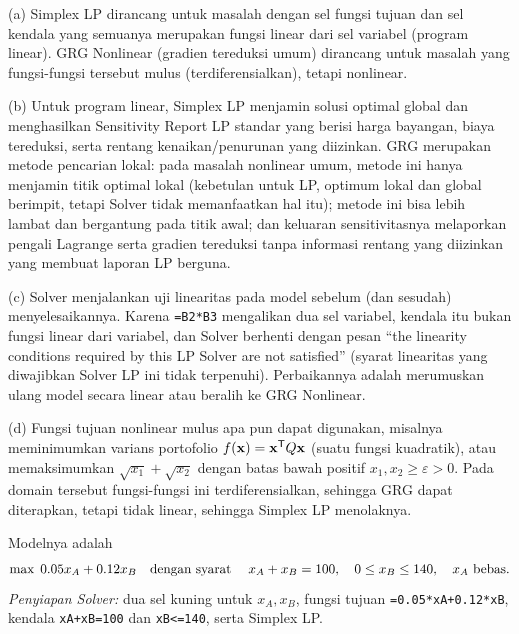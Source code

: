 
(a) Simplex LP dirancang untuk masalah dengan sel fungsi tujuan dan sel kendala yang semuanya merupakan fungsi linear dari sel variabel (program linear). GRG Nonlinear (gradien tereduksi umum) dirancang untuk masalah yang fungsi-fungsi tersebut mulus (terdiferensialkan), tetapi nonlinear.

(b) Untuk program linear, Simplex LP menjamin solusi optimal global dan menghasilkan Sensitivity Report LP standar yang berisi harga bayangan, biaya tereduksi, serta rentang kenaikan/penurunan yang diizinkan. GRG merupakan metode pencarian lokal: pada masalah nonlinear umum, metode ini hanya menjamin titik optimal lokal (kebetulan untuk LP, optimum lokal dan global berimpit, tetapi Solver tidak memanfaatkan hal itu); metode ini bisa lebih lambat dan bergantung pada titik awal; dan keluaran sensitivitasnya melaporkan pengali Lagrange serta gradien tereduksi tanpa informasi rentang yang diizinkan yang membuat laporan LP berguna.

(c) Solver menjalankan uji linearitas pada model sebelum (dan sesudah) menyelesaikannya. Karena \texttt{=B2*B3} mengalikan dua sel variabel, kendala itu bukan fungsi linear dari variabel, dan Solver berhenti dengan pesan ``the linearity conditions required by this LP Solver are not satisfied'' (syarat linearitas yang diwajibkan Solver LP ini tidak terpenuhi). Perbaikannya adalah merumuskan ulang model secara linear atau beralih ke GRG Nonlinear.

(d) Fungsi tujuan nonlinear mulus apa pun dapat digunakan, misalnya meminimumkan varians portofolio $f(\mathbf{x}) = \mathbf{x}^{\mathsf T} Q \mathbf{x}$ (suatu fungsi kuadratik), atau memaksimumkan $\sqrt{x_1} + \sqrt{x_2}$ dengan batas bawah positif $x_1,x_2 \geq \varepsilon > 0$. Pada domain tersebut fungsi-fungsi ini terdiferensialkan, sehingga GRG dapat diterapkan, tetapi tidak linear, sehingga Simplex LP menolaknya.

\Needspace{0.50\textheight}

Modelnya adalah
\[
\max \; 0.05x_A + 0.12x_B \quad \mbox{dengan syarat}\quad \; x_A + x_B = 100, \quad 0 \leq x_B \leq 140, \quad x_A \mbox{ bebas}.
\]
\emph{Penyiapan Solver:} dua sel kuning untuk $x_A, x_B$, fungsi tujuan \texttt{=0.05*xA+0.12*xB}, kendala \texttt{xA+xB=100} dan \texttt{xB<=140}, serta Simplex LP.

